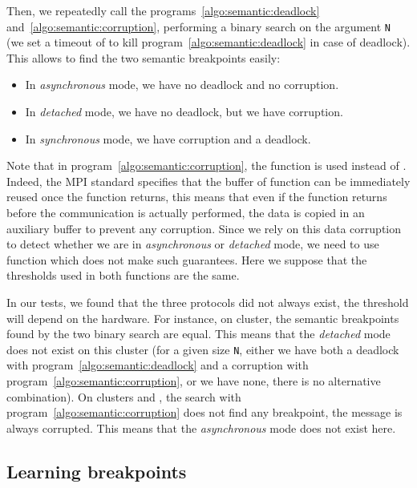            Then, we repeatedly call the programs~\ref{algo:semantic:deadlock} and~\ref{algo:semantic:corruption},
            performing a binary search on the argument \texttt{N} (we set a timeout of  to kill
            program~\ref{algo:semantic:deadlock} in case of deadlock). This allows to find the two semantic breakpoints
            easily:
            \begin{itemize}
                \item In \emph{asynchronous} mode, we have no deadlock and no corruption.
                \item In \emph{detached} mode, we have no deadlock, but we have corruption.
                \item In \emph{synchronous} mode, we have corruption and a deadlock.
            \end{itemize}

            Note that in program~\ref{algo:semantic:corruption}, the function \isend is used instead of \send. Indeed,
            the MPI standard specifies that the buffer of function \send can be immediately reused once the function
            returns, this means that even if the function returns before the communication is actually performed, the
            data is copied in an auxiliary buffer to prevent any corruption. Since we rely on this data corruption to
            detect whether we are in \emph{asynchronous} or \emph{detached} mode, we need to use function \isend which
            does not make such guarantees. Here we suppose that the thresholds used in both functions are the same.

            In our tests, we found that the three protocols did not always exist, the threshold will depend on the
            hardware. For instance, on \dahu cluster, the semantic breakpoints found by the two binary search are equal.
            This means that the \emph{detached} mode does not exist on this cluster (for a given size \texttt{N}, either
            we have both a deadlock with program~\ref{algo:semantic:deadlock} and a corruption with
            program~\ref{algo:semantic:corruption}, or we have none, there is no alternative combination).
            On clusters \paravance and \grisou, the search with program~\ref{algo:semantic:corruption} does not find any
            breakpoint, the message is always corrupted. This means that the \emph{asynchronous} mode does not exist
            here.

        \subsection{Learning breakpoints}%
        \label{sub:pycewise}

